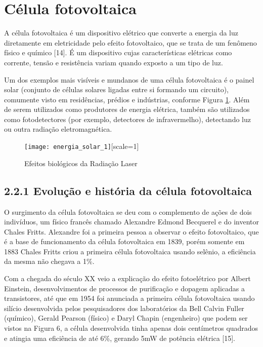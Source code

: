 \section{Célula fotovoltaica}

A célula fotovoltaica é um dispositivo elétrico que converte a energia da luz diretamente em eletricidade pelo efeito fotovoltaico, que se trata de um fenômeno físico e químico [14]. É um dispositivo cujas características elétricas como corrente, tensão e resistência variam quando exposto a um tipo de luz.

Um dos exemplos mais visíveis e mundanos de uma célula fotovoltaica é o painel solar (conjunto de células solares ligadas entre si formando um circuito), comumente visto em residências, prédios e indústrias, conforme Figura \ref{fig:energia_solar_1}. Além de serem utilizados como produtores de energia elétrica, também são utilizados como fotodetectores (por exemplo, detectores de infravermelho), detectando luz ou outra radiação eletromagnética.

\begin{figure}[ht!]
	\centering
	\caption{Efeitos biológicos da Radiação Laser}
	\label{fig:energia_solar_1}
	\texttt{[image: energia\_solar\_1]}[scale=1]
\end{figure}

\subsection{2.2.1	Evolução e história da célula fotovoltaica}

O surgimento da célula fotovoltaica se deu com o complemento de ações de dois indivíduos, um físico francês chamado Alexandre Edmond Becquerel e do inventor Chales Fritts. Alexandre foi a primeira pessoa a observar o efeito fotovoltaico, que é a base de funcionamento da célula fotovoltaica em 1839, porém somente em 1883 Chales Fritts criou a primeira célula fotovoltaica usando selênio, a eficiência da mesma não chegava a 1\%.

Com a chegada do século XX veio a explicação do efeito fotoelétrico por Albert Einstein, desenvolvimentos de processos de purificação e dopagem aplicadas a transistores, até que em 1954 foi anunciada a primeira célula fotovoltaica usando silício desenvolvida pelos pesquisadores dos laboratórios da Bell Calvin Fuller (químico), Gerald Pearson (físico) e Daryl Chapin (engenheiro) que podem ser vistos na Figura 6, a célula desenvolvida tinha apenas dois centímetros quadrados e atingia uma eficiência de até 6\%, gerando 5mW de potência elétrica [15].

